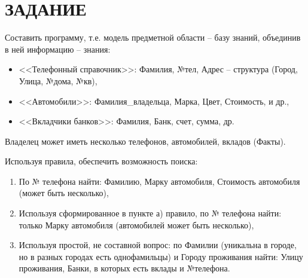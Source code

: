 \section{ЗАДАНИЕ}

Составить программу, т.е. модель предметной области – базу знаний, объединив в ней информацию – знания:

\begin{itemize}
    \item <<Телефонный справочник>>: Фамилия, №тел, Адрес – структура (Город, Улица, №дома, №кв),
    \item <<Автомобили>>: Фамилия\_владельца, Марка, Цвет, Стоимость, и др.,
    \item <<Вкладчики банков>>: Фамилия, Банк, счет, сумма, др.
\end{itemize}

Владелец может иметь несколько телефонов, автомобилей, вкладов (Факты).

Используя правила, обеспечить возможность поиска:

\begin{enumerate}
    \item По № телефона найти: Фамилию, Марку автомобиля, Стоимость автомобиля (может быть несколько),
    \item Используя сформированное в пункте а) правило, по № телефона найти: только Марку автомобиля (автомобилей может быть несколько),
    \item Используя простой, не составной вопрос: по Фамилии (уникальна в городе, но в разных городах есть однофамильцы) и Городу проживания найти: Улицу проживания, Банки, в которых есть вклады и №телефона.
\end{enumerate}

